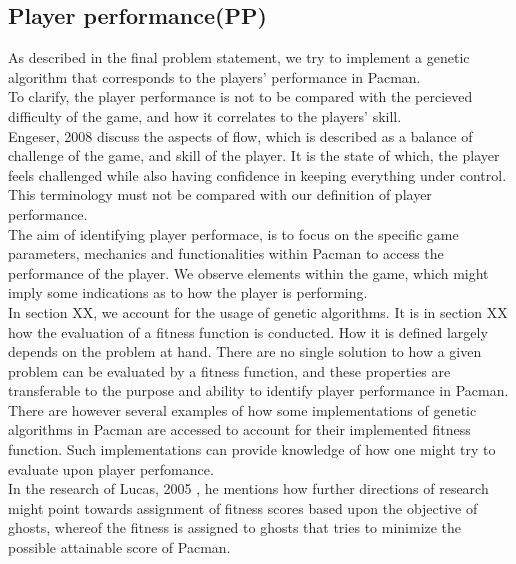 \subsection{Player performance(PP)}

As described in the final problem statement, we try to implement a genetic algorithm that corresponds to the players' performance in Pacman.\\

To clarify, the player performance is not to be compared with the percieved difficulty of the game, and how it correlates to the players' skill.\\ Engeser, 2008 \cite{Engeser2008} discuss the aspects of flow, which is described as a balance of challenge of the game, and skill of the player. It is the state of which, the player feels challenged while also having confidence in keeping everything under control. \cite[pp. 158]{Engeser2008}\\
This terminology must not be compared with our definition of player performance.\\

The aim of identifying player performace, is to focus on the specific game parameters, mechanics and functionalities within Pacman to access the performance of the player. We observe elements within the game, which might imply some indications as to how the player is performing.\\

In section XX, we account for the usage of genetic algorithms. It is in section XX how the evaluation of a fitness function is conducted. How it is defined largely depends on the problem at hand. There are no single solution to how a given problem can be evaluated by a fitness function, and these properties are transferable to the purpose and ability to identify player performance in Pacman.\\

There are however several examples of how some implementations of genetic algorithms in Pacman are accessed to account for their implemented fitness function. Such implementations can provide knowledge of how one might try to evaluate upon player perfomance.\\

In the research of Lucas, 2005 \cite{Lucas2005}, he mentions how further directions of research might point towards assignment of fitness scores based upon the objective of ghosts, whereof the fitness is assigned to ghosts that tries to minimize the possible attainable score of Pacman.\\

